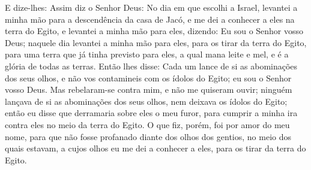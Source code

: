 E dize-lhes: Assim diz o Senhor Deus: No dia em que escolhi a
Israel, levantei a minha mão para a descendência da casa de Jacó, e
me dei a conhecer a eles na terra do Egito, e levantei a minha mão
para eles, dizendo: Eu sou o Senhor vosso Deus; naquele dia
levantei a minha mão para eles, para os tirar da terra do Egito,
para uma terra que já tinha previsto para eles, a qual mana leite e
mel, e é a glória de todas as terras. Então lhes disse: Cada um
lance de si as abominações dos seus olhos, e não vos contamineis com
os ídolos do Egito; eu sou o Senhor vosso Deus. Mas rebelaram-se
contra mim, e não me quiseram ouvir; ninguém lançava de si as
abominações dos seus olhos, nem deixava os ídolos do Egito; então eu
disse que derramaria sobre eles o meu furor, para cumprir a minha
ira contra eles no meio da terra do Egito. O que fiz, porém, foi
por amor do meu nome, para que não fosse profanado diante dos olhos
dos gentios, no meio dos quais estavam, a cujos olhos eu me dei a
conhecer a eles, para os tirar da terra do Egito.

